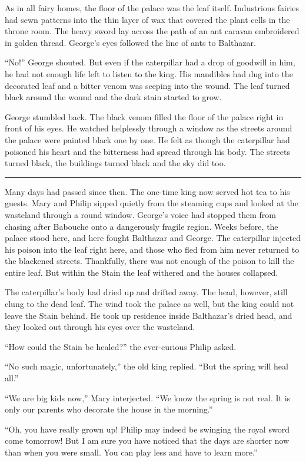 \documentclass[10pt, draft]{memoir}
\renewcommand{\pfbreakdisplay}{\bigskip \ding{166} \bigskip}
\newcommand{\secbreak}{\fancybreak{\pfbreakdisplay}}
\begin{document}
As in all fairy homes, the floor of the palace was the leaf itself. Industrious
fairies had sewn patterns into the thin layer of wax that covered the plant
cells in the throne room. The heavy sword lay across the path of an ant caravan
embroidered in golden thread. George's eyes followed the line of ants to
Balthazar.

``No!'' George shouted. But even if the caterpillar had a drop of goodwill in
him, he had not enough life left to listen to the king. His mandibles had dug
into the decorated leaf and a bitter venom was seeping into the wound. The leaf
turned black around the wound and the dark stain started to grow.

George stumbled back. The black venom filled the floor of the palace right in
front of his eyes. He watched helplessly through a window as the streets around
the palace were painted black one by one. He felt as though the caterpillar had
poisoned his heart and the bitterness had spread through his body. The streets
turned black, the buildings turned black and the sky did too.

\secbreak

Many days had passed since then. The one-time king now served hot tea to his
guests. Mary and Philip sipped quietly from the steaming cups and looked at the
wasteland through a round window. George's voice had stopped them from chasing
after Babouche onto a dangerously fragile region. Weeks before, the palace
stood here, and here fought Balthazar and George. The caterpillar injected his
poison into the leaf right here, and those who fled from him never returned to
the blackened streets. Thankfully, there was not enough of the poison to kill
the entire leaf. But within the Stain the leaf withered and the houses
collapsed.

The caterpillar's body had dried up and drifted away. The head, however, still
clung to the dead leaf. The wind took the palace as well, but the king could
not leave the Stain behind. He took up residence inside Balthazar's dried head,
and they looked out through his eyes over the wasteland.

``How could the Stain be healed?'' the ever-curious Philip asked.

``No such magic, unfortunately,'' the old king replied. ``But the spring will
heal all.''

``We are big kids now,'' Mary interjected. ``We know the spring is not real. It
is only our parents who decorate the house in the morning.''

``Oh, you have really grown up! Philip may indeed be swinging the royal sword
come tomorrow! But I am sure you have noticed that the days are shorter now
than when you were small. You can play less and have to learn more.''
\end{document}
